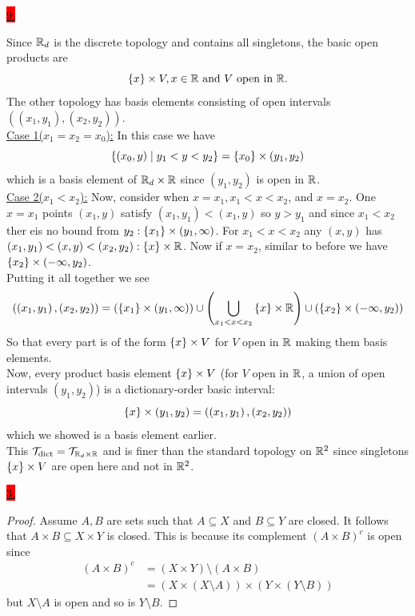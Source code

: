 \documentclass{exam}
\begin{document}
\colorbox{red}{\underline{9:}}
\begin{solution}
    Since $\mathbb R_d$ is the discrete topology and contains all singletons, the basic open products are 
    \[
        \left\{x \right\} \times V, x \in \mathbb R \text{ and } V \text{ open in } \mathbb R.  
    \]
    The other topology has basis elements consisting of open intervals $\left(\left(x_1, y_1\right), \left(x_2, y_2\right)\right)$. \\
    \underline{Case 1($x_1 = x_2 = x_0$):} In this case we have 
    \[
        \left\{\left(x_0, y\right) \mid y_1 < y < y_2 \right\} = \left\{x_0 \right\} \times (y_1, y_2) 
    \]
    which is a basis element of $\mathbb R_d \times \mathbb R$ since $(y_1, y_2)$ is open in $\mathbb R$. \\
    \underline{Case 2($x_1 < x_2$):} Now, consider when $x = x_1, x_1 < x < x_2$, and $x = x_2$. One $x = x_1$ points $(x_1, y)$ satisfy $(x_1, y_1) < (x_1, y)$ so $y > y_1$ and since $x_1 < x_2$ ther eis no bound from $y_2: \left\{x_1 \right\} \times (y_1, \infty)$. For $x_1 < x < x_2$ any $(x, y)$ has $(x_1, y_1) < (x, y) < (x_2, y_2): \left\{x \right\} \times \mathbb R$. Now if $x = x_2$, similar to before we have $\left\{x_2 \right\} \times \left(-\infty, y_2\right)$. \\
    Putting it all together we see 
    \[
        \left(\left(x_1, y_1\right), \left(x_2, y_2\right)\right) = \left(\left\{x_1 \right\} \times \left(y_1, \infty\right)\right) \cup \left(\bigcup_{x_1 < x < x_2} \left\{x \right\} \times \mathbb R\right) \cup \left(\left\{x_2 \right\} \times \left(-\infty, y_2\right)\right)
    \]
    So that every part is of the form $\left\{x \right\} \times V$ for $V$ open in $\mathbb R$ making them basis elements. \\
    Now, every product basis element $\left\{x \right\} \times V$ (for $V$ open in $\mathbb R$, a union of open intervals $\left(y_1, y_2\right)$) is a dictionary-order basic interval: 
    \[
        \left\{x \right\} \times (y_1, y_2) = \left(\left(x_1, y_1\right), \left(x_2, y_2\right)\right)
    \]
    which we showed is a basis element earlier. \\
    This $\mathcal{T}_{\text{dict}} = \mathcal{T}_{\mathbb R_{d} \times \mathbb R}$ and is finer than the standard topology on $\mathbb R^{2}$ since singletons $\left\{x \right\} \times V$ are open here and not in $\mathbb R^{2}$.
\end{solution}

\colorbox{red}{\underline{3:}}
\begin{solution}
    \begin{proof}
        Assume $A, B$ are sets such that $A \subseteq X$ and $B \subseteq Y$ are closed. It follows that $A \times B \subseteq X \times Y$ is closed. This is because its  complement $(A \times B)^{c}$ is open since 
        \begin{align*}
            (A \times B)^c &= (X \times Y) \setminus (A \times B) \\
            &= (X \times (X \setminus A)) \times (Y \times (Y \setminus B))
        \end{align*}
        but $X \setminus A$ is open and so is $Y \setminus B$.
    \end{proof}
\end{solution}
\end{document}
